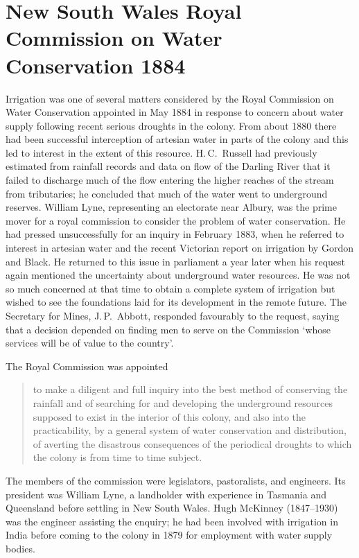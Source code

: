 \section*{New South Wales Royal Commission on Water Conservation 1884}

Irrigation was one of several matters considered by the Royal
Commission on Water Conservation appointed in May 1884 in response to
concern about water supply following recent serious droughts in the
colony.  From about 1880 there had been successful interception of
artesian water in parts of the colony and this led to interest in the
extent of this resource.  H.\,C.~Russell had previously estimated from
rainfall records and data on flow of the Darling River that it failed
to discharge much of the flow entering the higher reaches of the
stream from tributaries; he concluded that much of the water went to
underground reserves.  William Lyne, representing an electorate
near Albury, was the prime mover for a royal commission to consider
the problem of water conservation.  He had pressed unsuccessfully for
an inquiry in February 1883, when he referred to interest in artesian
water and the recent Victorian report on irrigation by Gordon and
Black.  He returned to this issue in parliament a year later when his
request again mentioned the uncertainty about underground water
resources.  He was not so much concerned at that time to obtain a
complete system of irrigation but wished to see the foundations laid
for its development in the remote future.  The Secretary for Mines, J.\,P.~Abbott,
responded favourably to the request, saying that a decision depended
on finding men to serve on the Commission `whose services will be of
value to the country'.

The Royal Commission was appointed
\begin{quote}
	to make a diligent and full inquiry into the best method of
	conserving the rainfall and of searching for and developing
	the underground resources supposed to exist in the interior of
	this colony, and also into the practicability, by a general
	system of water conservation and distribution, of averting the
	disastrous consequences of the periodical droughts to which
	the colony is from time to time subject.
\end{quote}
The members of the commission were legislators, pastoralists, and
engineers. Its president was William Lyne, a landholder with
experience in Tasmania and Queensland before settling in New South
Wales.  Hugh McKinney
(1847--1930) was the engineer assisting the enquiry; he had been
involved with irrigation in India before coming to the colony in 1879
for employment with water supply bodies.

